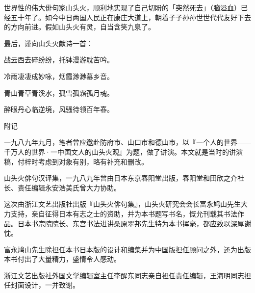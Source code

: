 {    世界性的伟大俳句家山头火，顺利地实现了自己切盼的「突然死去」（脑溢血）巳经五十年了。如今中日两国人民正在康庄大道上，朝着子子孙孙世世代代友好下去的方向前进。假如山头火有灵，自当含笑九泉了。

    最后，谨向山头火献诗一首：
    \begin{center}
        战云西去碎纷纷，托钵漫游耽苦吟。

        冷雨凄凄成妙咏，烟霞渺渺慕乡音。

        青山青草青溪水，孤雪孤霜孤月魂。

        醉眼丹心临逆境，风骚待领百年春。
    \end{center}

    {\Large 附记}

    一九八九年九月，笔者曾应邀赴防府市、山口市和德山市，以『一个人的世界——千万人的世界·一中国文人的山头火观』为题，做了讲演。本文就是当时的讲演稿，付梓时考虑到对象有别，略有补充和删改。

    山头火俳句汉译集，一九八九年曾由日本东京春阳堂出版，春阳堂和田欣之介社长、责任编辑永安浩美氏曾大力协助。

    这次由浙江文艺出版社出版『山头火俳句集』，山头火研究会会长富永鸠山先生大力支持，亲自征得日本有志之士的资助，并为本书题写书名，慨允刊载其书法作品。日本书宗院院长、东宫书法进讲桑原翠邦先生特为本书挥毫，都应致以深厚谢忱。

    富永鸠山先生除担任本书日本版的设计和编集并为中国版担任顾问之外，还为出版本书付出了大量精力，盛情令人感动。

    浙江文艺出版社外国文学编辑室主任李醒东同志亲自袒任责任编辑，王海明同志担任封面设计，一并致谢。
}
